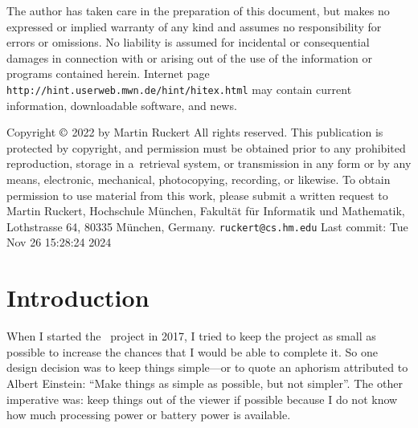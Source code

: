 \titletrue
\begingroup
\figrm
\parindent=0pt

{\raggedright\advance\rightskip 3.5pc 
The author has taken care in the preparation of this document,
but makes no expressed or implied warranty of any kind and assumes no
responsibility for errors or omissions. No liability is assumed for
incidental or consequential damages in connection with or arising out
of the use of the information or programs contained herein.
\bigskip
{\def\:{\discretionary{}{}{}}
Internet page  {\tt http:\://hint.\:userweb.\:mwn.\:de/\:hint/hitex.html}
may contain current information, downloadable software,
and news.}

\vfill
Copyright $\copyright$ 2022 by Martin Ruckert
\smallskip
All rights reserved.
\smallskip
This publication is protected by copyright, and permission must be
obtained prior to any prohibited reproduction, storage in
a~retrieval system, or transmission in any form or by any means, electronic,
mechanical, photocopying, recording, or likewise.
To obtain permission to use material from this work, please submit a written
request to Martin Ruckert,
Hochschule M\"unchen,
Fakult\"at f\"ur Informatik und Mathematik,
Lothstrasse 64,
80335 M\"unchen,
Germany.
\medskip
{\tt ruckert\:@cs.hm.edu}
\medskip
Last commit: Tue Nov 26 15:28:24 2024
\par
}
\eject
\endgroup

\frontmatter
{}%

\tableofcontent

\mainmatter

\def\rule#1:#2.{\par{\hangindent32pt\hangafter1\parindent0pt\rightskip 0pt plus 60pt#1{\bf:}\quad%
  \hskip 0pt plus 60pt\penalty-300\hskip 0pt plus -60pt#2{\bf.}\par}}
\def\prim#1.{\par{\hangindent32pt\hangafter1\parindent0pt\rightskip 0pt plus 60pt#1\par}}  
\def\sym#1{$\left<\right.${\it #1\/}$\left.\right>$}
\def\OR{${}\vert{}$}
\def\opt#1{$\left[\right.$#1$\left.\right]$}
\def\ctl#1{{\tt\BS #1}}


\section{Introduction}
When I started the \HINT\ project in 2017,
I tried to keep the project as small as possible to increase the
chances that I would be able to complete it. So one design decision
was to keep things simple---or to quote an aphorism attributed to
Albert Einstein: ``Make things as simple as possible, but not simpler''.
The other imperative was:
keep things out of the viewer if possible because I do not know
how much processing power or battery power is available.

